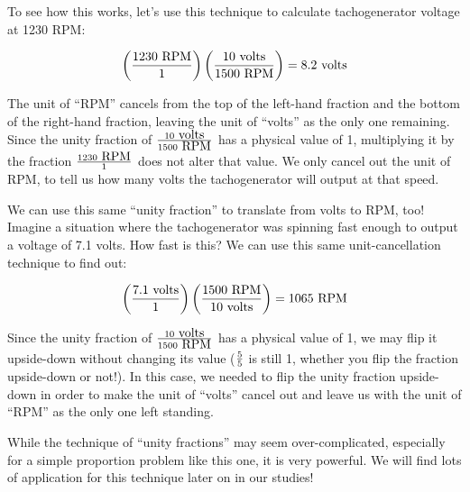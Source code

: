 To see how this works, let's use this technique to calculate tachogenerator voltage at 1230 RPM:

$$\left({1230 \hbox{ RPM} \over 1} \right)  \left( {10 \hbox{ volts} \over 1500 \hbox{ RPM}} \right) = 8.2 \hbox{ volts}$$

The unit of ``RPM'' cancels from the top of the left-hand fraction and the bottom of the right-hand fraction, leaving the unit of ``volts'' as the only one remaining.  Since the unity fraction of $10 \hbox{ volts} \over 1500 \hbox{ RPM}$ has a physical value of 1, multiplying it by the fraction $1230 \hbox{ RPM} \over 1$ does not alter that value.  We only cancel out the unit of RPM, to tell us how many volts the tachogenerator will output at that speed.

We can use this same ``unity fraction'' to translate from volts to RPM, too!  Imagine a situation where the tachogenerator was spinning fast enough to output a voltage of 7.1 volts.  How fast is this?  We can use this same unit-cancellation technique to find out:

$$\left({7.1 \hbox{ volts} \over 1} \right)  \left( 1500 \hbox{ RPM} \over {10 \hbox{ volts}} \right) = 1065 \hbox{ RPM}$$

Since the unity fraction of $10 \hbox{ volts} \over 1500 \hbox{ RPM}$ has a physical value of 1, we may flip it upside-down without changing its value ($5 \over 5$ is still 1, whether you flip the fraction upside-down or not!).  In this case, we needed to flip the unity fraction upside-down in order to make the unit of ``volts'' cancel out and leave us with the unit of ``RPM'' as the only one left standing.

\vskip 10pt

While the technique of ``unity fractions'' may seem over-complicated, especially for a simple proportion problem like this one, it is very powerful.  We will find lots of application for this technique later on in our studies!





